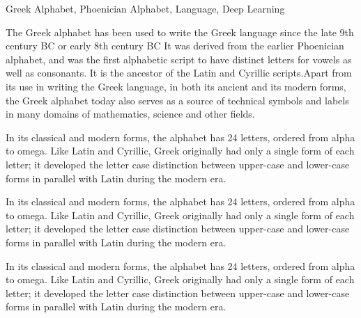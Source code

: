 \documentclass[master]{dutthesis} %
\begin{document}
\begin{englishabstract}{Greek Alphabet, Phoenician Alphabet, Language, Deep Learning}

The Greek alphabet has been used to write the Greek language since the late 9th
century BC or early 8th century BC It was derived from the earlier
Phoenician alphabet, and was the first alphabetic script to have distinct
letters for vowels as well as consonants. It is the ancestor of the Latin
and Cyrillic scripts.Apart from its use in writing the Greek language, in
both its ancient and its modern forms, the Greek alphabet today also serves
as a source of technical symbols and labels in many domains of mathematics,
science and other fields. \par
In its classical and modern forms, the alphabet has 24 letters, ordered from
alpha to omega. Like Latin and Cyrillic, Greek originally had only a single
form of each letter; it developed the letter case distinction between
upper-case and lower-case forms in parallel with Latin during the modern era.

In its classical and modern forms, the alphabet has 24 letters, ordered from
alpha to omega. Like Latin and Cyrillic, Greek originally had only a single
form of each letter; it developed the letter case distinction between
upper-case and lower-case forms in parallel with Latin during the modern era.

In its classical and modern forms, the alphabet has 24 letters, ordered from
alpha to omega. Like Latin and Cyrillic, Greek originally had only a single
form of each letter; it developed the letter case distinction between
upper-case and lower-case forms in parallel with Latin during the modern era.
\end{englishabstract}
\tableofcontents
\tableofengcontents
\cleardoublepage

\tableoffigurecontents
\tableoftablecontents
\stcleardp


\end{document}
